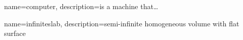 {
    name=computer,
    description={is a machine that\ldots}
}

{
    name={infiniteslab},
    description={semi-infinite homogeneous volume with flat surface}
}
